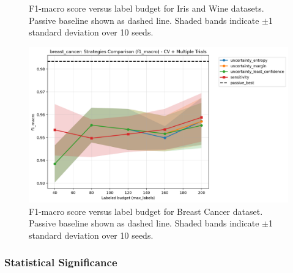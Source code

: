 \documentclass[conference]{IEEEtran}
\begin{document}
\begin{figure}[t]
\centering
{}
\hfill
{}
\caption{F1-macro score versus label budget for Iris and Wine datasets. Passive baseline shown as dashed line. Shaded bands indicate $\pm$1 standard deviation over 10 seeds.}
\label{fig:f1-compare}
\end{figure}

\begin{figure}[t]
\centering
\includegraphics[width=0.95\columnwidth]{figures/cls_breast_cancer_comparison_f1_macro.png}
\caption{F1-macro score versus label budget for Breast Cancer dataset. Passive baseline shown as dashed line. Shaded bands indicate $\pm$1 standard deviation over 10 seeds.}
\label{fig:breast-f1-compare}
\end{figure}

\subsubsection{Statistical Significance}
\end{document}
